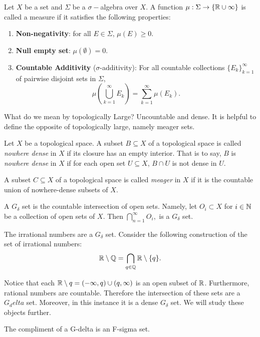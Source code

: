 \begin{definition}[Measure]
    Let $X$ be a set and $\Sigma$ be a $\sigma-$algebra over $X$.  A function $\mu: \Sigma \to \{\mathbb{R} \cup \infty\}$ is called a measure if it satisfies the following properties:
    \begin{enumerate}
        \item \textbf{Non-negativity}: for all $E \in \Sigma$, $\mu(E)\geq 0$.
        \item \textbf{Null empty set}: $\mu(\emptyset) = 0$. 
        \item \textbf{Countable Additivity} ($\sigma$-additivity): For all countable collections $\{E_k\}_{k=1}^\infty$ of pairwise disjoint sets in $\Sigma$, $$\mu\left( \bigcup_{k=1}^\infty E_k \right) = \sum_{k=1}^\infty \mu(E_k).$$
    \end{enumerate}
\end{definition}
What do we mean by topologically Large? Uncountable and dense.  It is helpful to define the opposite of topologically large, namely meager sets.  
\begin{definition}  Let $X$ be a topological space.  A subset $B \subseteq X$ of a topological space is called \textit{nowhere dense} in $X$ if its closure has an empty interior.  That is to say, $B$ is \textit{nowhere dense} in $X$ if for each open set $U\subseteq X$, $B\cap U$ is not dense in $U$.      
\end{definition}

\begin{definition}[Meager]  A subset $C \subseteq X$ of a topological space is called \textit{meager} in $X$ if it is the countable union of nowhere-dense subsets of $X$.    
\end{definition}

\begin{definition}
    A $G_\delta$ set is the countable intersection of open sets.  Namely, let $O_i \subset X$ for $i \in \mathbb{N}$ be a collection of open sets of $X$.  Then 
    $\bigcap_{n=1}^\infty O_i,$ is a $G_\delta$ set.  
\end{definition}

\begin{example}
    The irrational numbers are a $G_\delta$ set.  Consider the following construction of the set of irrational numbers:
    $$\mathbb{R} \setminus \mathbb{Q} = \bigcap_{q \in \mathbb{Q}}\mathbb{R} \setminus \{q\}.$$
\end{example}
Notice that each $\mathbb{R}\setminus q = (-\infty, q) \cup (q, \infty)$ is an open subset of $\mathbb{R}$.  Furthermore, rational numbers are countable.  Therefore the intersection of these sets are a $G_delta$ set.  Moreover, in this instance it is a dense $G_\delta$ set.  We will study these objects further.  

The compliment of a G-delta is an F-sigma set.  